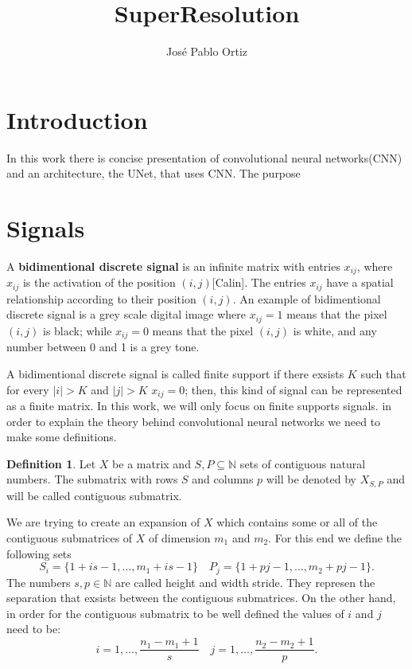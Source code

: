 \documentclass{article}
\theoremstyle{definition}
\newtheorem{definition}{Definition}
\begin{document}
\title{SuperResolution}

\author{José Pablo Ortiz}
\maketitle

\section{Introduction}
In this work there is concise presentation of convolutional neural networks(CNN) and an architecture, the UNet, that uses CNN. The purpose
\section{Signals}
A \textbf{bidimentional discrete signal} is an infinite matrix with entries $x_{ij}$, where $x_{ij}$ is the activation of the position $(i,j)$[Calin]. The entries $x_{ij}$  have a spatial relationship according to their position $(i,j)$. An example of bidimentional discrete signal is a grey scale digital image where $x_{ij}=1$ means that the pixel $(i,j)$ is black; while $x_{ij}=0$ means that the pixel $(i,j)$ is white, and any number between 0 and 1 is a grey tone.

\noindent
A bidimentional discrete signal is called finite support if there exsists $K$ such that for every $|i|>K$ and $|j|>K$ $x_{ij}= 0$; then, this kind of signal can be represented as a finite matrix. In this work, we will only focus on finite supports signals. in order to explain the theory behind convolutional neural networks we need to make some definitions. 



\begin{definition}
Let $X$ be a matrix and  $S,P\subseteq \mathbb{N}$ sets of contiguous natural numbers. The submatrix with rows $S$ and columns $p$ will be denoted by $X_{S,P}$ and will be called contiguous submatrix.
\end{definition}
\noindent
We are trying to create an expansion of $X$ which contains some or all of the contiguous submatrices of $X$ of dimension $m_1$ and $m_2$. For this end we define the following sets
\begin{equation}
S_i=\{1+is-1,\dots,m_1+is-1\}\quad P_j = \{1+pj-1,\dots,m_2+pj-1\}.
\end{equation}
The numbers $s,p\in\mathbb{N}$  are called height and width stride. They represen the separation that exsists between the contiguous submatrices. On the other hand, in order for the contiguous submatrix to be well defined the values of $i$ and $j$ need to be:
$$i= 1,\dots,\frac{n_1-m_1+1}{s}\quad j= 1,\dots,\frac{n_2-m_2+1}{p}. $$
\end{document}
